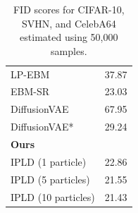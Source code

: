 \begin{table}[htp]
\begin{minipage}[t]{0.45\textwidth}
\begin{subtable}[t]{\textwidth}
{\begin{tabular}{l c}
        LP-EBM \citep{pangLearningLatentSpace2020} & 37.87 \\
        EBM-SR \citep{nijkamp2019shortrun} & 23.03 \\
        {DiffusionVAE} \citep{wehenkeldiffusionpriorsvariational2021} & 67.95  \\
        {DiffusionVAE}* & 29.24  \\
        \midrule
         \multicolumn{2}{l}{\textbf{Ours}} \\
        IPLD (1 particle)   & 22.86 \\
        IPLD (5 particles)    & 21.55\\
        IPLD (10 particles)  & 21.43 \\
        \bottomrule
    \end{tabular}
}
\caption{\textbf{FID($\downarrow$) of models trained on CelebA64}.}
\end{subtable}
\medskip
\begin{subtable}[t]{\textwidth}
    \centering
    \caption{\textbf{FID($\downarrow$) of models trained on SVHN}.}
\end{subtable}
\end{minipage}
\caption{FID scores for CIFAR-10, SVHN, and CelebA64 estimated using 50,000 samples.}
\label{tab:fid_scores}
\end{table}